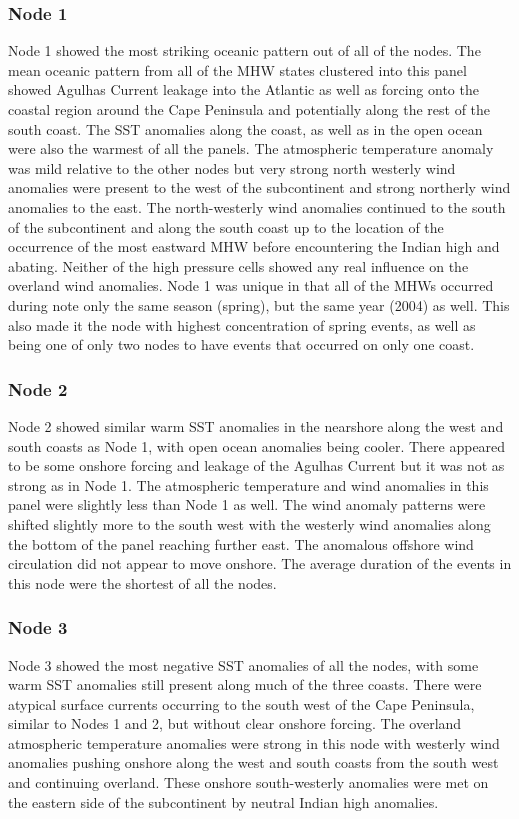 \documentclass[utf8]{frontiersSCNS}
\begin{document}








\subsubsection{Node 1}
Node 1 showed the most striking oceanic pattern out of all of the nodes. The mean oceanic pattern from all of the MHW states clustered into this panel showed Agulhas Current leakage into the Atlantic as well as forcing onto the coastal region around the Cape Peninsula and potentially along the rest of the south coast. The SST anomalies along the coast, as well as in the open ocean were also the warmest of all the panels. The atmospheric temperature anomaly was mild relative to the other nodes but very strong north westerly wind anomalies were present to the west of the subcontinent and strong northerly wind anomalies to the east. The north-westerly wind anomalies continued to the south of the subcontinent and along the south coast up to the location of the occurrence of the most eastward MHW before encountering the Indian high and abating. Neither of the high pressure cells showed any real influence on the overland wind anomalies. Node 1 was unique in that all of the MHWs occurred during note only the same season (spring), but the same year (2004) as well. This also made it the node with highest concentration of spring events, as well as being one of only two nodes to have events that occurred on only one coast.

\subsubsection{Node 2}
Node 2 showed similar warm SST anomalies in the nearshore along the west and south coasts as Node 1, with open ocean anomalies being cooler. There appeared to be some onshore forcing and leakage of the Agulhas Current but it was not as strong as in Node 1. The atmospheric temperature and wind anomalies in this panel were slightly less than Node 1 as well. The wind anomaly patterns were shifted slightly more to the south west with the westerly wind anomalies along the bottom of the panel reaching further east. The anomalous offshore wind circulation did not appear to move onshore. The average duration of the events in this node were the shortest of all the nodes.

\subsubsection{Node 3}
Node 3 showed the most negative SST anomalies of all the nodes, with some warm SST anomalies still present along much of the three coasts. There were atypical surface currents occurring to the south west of the Cape Peninsula, similar to Nodes 1 and 2, but without clear onshore forcing. The overland atmospheric temperature anomalies were strong in this node with westerly wind anomalies pushing onshore along the west and south coasts from the south west and continuing overland. These onshore south-westerly anomalies were met on the eastern side of the subcontinent by neutral Indian high anomalies.
\end{document}

